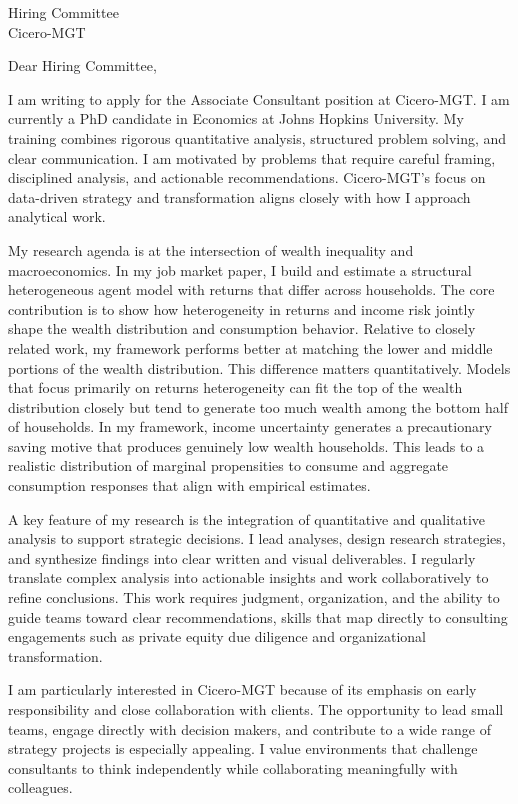 \documentclass[11pt]{letter}
\begin{document}
\begin{letter}{Hiring Committee \\ Cicero\textregistered-MGT}

\opening{Dear Hiring Committee,}

I am writing to apply for the Associate Consultant position at Cicero-MGT. I am currently a PhD candidate in Economics at Johns Hopkins University. My training combines rigorous quantitative analysis, structured problem solving, and clear communication. I am motivated by problems that require careful framing, disciplined analysis, and actionable recommendations. Cicero-MGT’s focus on data-driven strategy and transformation aligns closely with how I approach analytical work.

My research agenda is at the intersection of wealth inequality and macroeconomics. In my job market paper, I build and estimate a structural heterogeneous agent model with returns that differ across households. The core contribution is to show how heterogeneity in returns and income risk jointly shape the wealth distribution and consumption behavior. Relative to closely related work, my framework performs better at matching the lower and middle portions of the wealth distribution. This difference matters quantitatively. Models that focus primarily on returns heterogeneity can fit the top of the wealth distribution closely but tend to generate too much wealth among the bottom half of households. In my framework, income uncertainty generates a precautionary saving motive that produces genuinely low wealth households. This leads to a realistic distribution of marginal propensities to consume and aggregate consumption responses that align with empirical estimates.

A key feature of my research is the integration of quantitative and qualitative analysis to support strategic decisions. I lead analyses, design research strategies, and synthesize findings into clear written and visual deliverables. I regularly translate complex analysis into actionable insights and work collaboratively to refine conclusions. This work requires judgment, organization, and the ability to guide teams toward clear recommendations, skills that map directly to consulting engagements such as private equity due diligence and organizational transformation.

I am particularly interested in Cicero-MGT because of its emphasis on early responsibility and close collaboration with clients. The opportunity to lead small teams, engage directly with decision makers, and contribute to a wide range of strategy projects is especially appealing. I value environments that challenge consultants to think independently while collaborating meaningfully with colleagues.


\end{letter}
\end{document}
